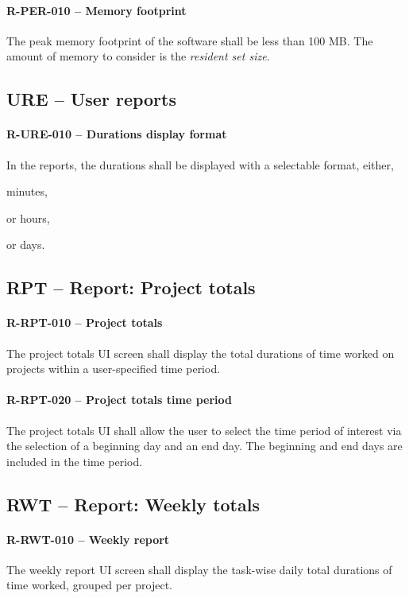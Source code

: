 \paragraph{R-PER-010 -- Memory footprint}
The peak memory footprint of the software shall be less than 100 MB.
The amount of memory to consider is the \emph{resident set size}.

\subsection{URE -- User reports}
\paragraph{R-URE-010 -- Durations display format}
In the reports, the durations shall be displayed with a selectable format,
either,
\begin{compactitem}
  \item minutes,
  \item or hours,
  \item or days.
\end{compactitem}

\subsection{RPT -- Report: Project totals}
\paragraph{R-RPT-010 -- Project totals}
The project totals UI screen shall display the total durations of time
worked on projects within a user-specified time period.

\paragraph{R-RPT-020 -- Project totals time period}
The project totals UI shall allow the user to select the time period
of interest via the selection of a beginning day and an end day. The
beginning and end days are included in the time period.

\subsection{RWT -- Report: Weekly totals}
\paragraph{R-RWT-010 -- Weekly report}
The weekly report UI screen shall display the task-wise daily total
durations of time worked, grouped per project.

